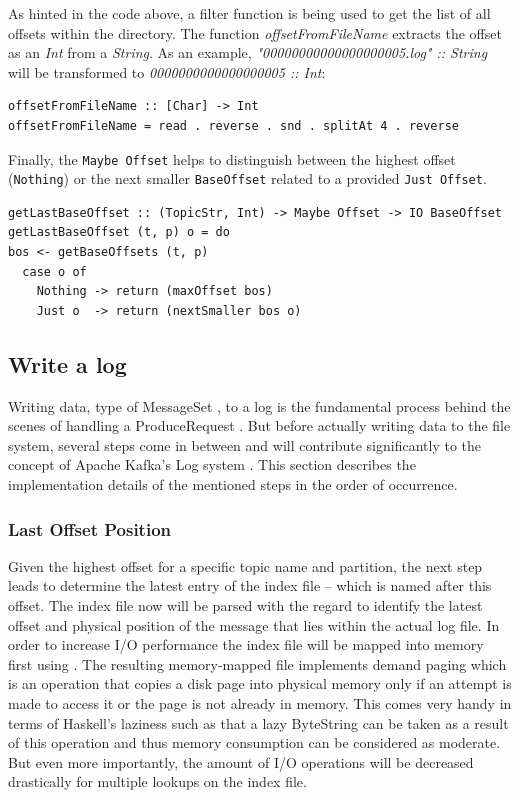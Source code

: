 As hinted in the code above, a filter function is being used to get the list of
all offsets within the directory. The function \textit{offsetFromFileName}
extracts the offset as an \textit{Int} from a \textit{String}. As an example,
\textit{"00000000000000000005.log" :: String } will be transformed to
\textit{0000000000000000005 :: Int}:

\begin{lstlisting}
offsetFromFileName :: [Char] -> Int
offsetFromFileName = read . reverse . snd . splitAt 4 . reverse
\end{lstlisting}

Finally, the \lstinline{Maybe Offset} helps to distinguish between the highest offset
(\lstinline{Nothing}) or the next smaller \lstinline{BaseOffset} related to a provided
\lstinline{Just Offset}. 

\begin{lstlisting}
getLastBaseOffset :: (TopicStr, Int) -> Maybe Offset -> IO BaseOffset
getLastBaseOffset (t, p) o = do
bos <- getBaseOffsets (t, p)
  case o of
    Nothing -> return (maxOffset bos)
    Just o  -> return (nextSmaller bos o)
\end{lstlisting}

\subsection{Write a log}

Writing data, type of MessageSet , to a log is the
fundamental process behind the scenes of handling a ProduceRequest . But before actually writing data to the file system, several
steps come in between and will contribute significantly to the concept of
Apache Kafka's Log system . This section describes
the implementation details of the mentioned steps in the order of occurrence.



\subsubsection{Last Offset Position}

Given the highest offset for a specific topic name and partition, the next step
leads to determine the latest entry of the index file -- which is named after
this offset. The index file now will be parsed with the regard to identify the
latest offset and physical position of the message that lies within the actual
log file. In order to increase I/O performance the index file will be mapped
into memory first using
. The resulting
memory-mapped file implements demand paging which is an operation that copies a
disk page into physical memory only if an attempt is made to access it or the
page is not already in memory. This comes very handy in terms of Haskell's
laziness such as that a lazy ByteString can be taken as a result of this
operation and thus memory consumption can be considered as moderate. But even
more importantly, the amount of I/O operations will be decreased drastically
for multiple lookups on the index file.

